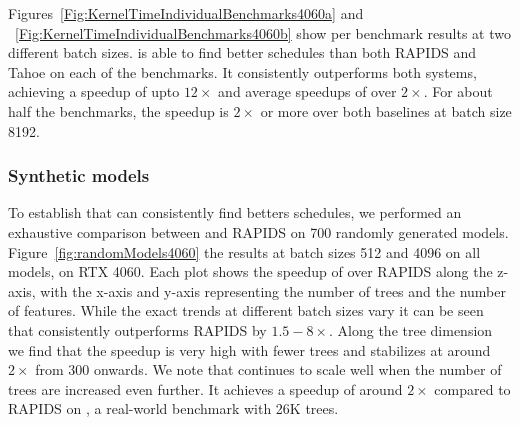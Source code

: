 
Figures~\ref{Fig:KernelTimeIndividualBenchmarks4060a} and ~\ref{Fig:KernelTimeIndividualBenchmarks4060b} 
show per benchmark results at two different batch sizes. 
\Treebeard{} is able to find better schedules than both RAPIDS and Tahoe on each of the benchmarks. It consistently
outperforms both systems, achieving a speedup of upto $12\times$ and average speedups of over $2\times$.
For about half the benchmarks, the speedup is $2\times$ or more over both baselines at batch size 8192.

\subsubsection*{Synthetic models}
To establish that \Treebeard{} can consistently find betters schedules, we performed an exhaustive comparison between \Treebeard{} and RAPIDS on 700 randomly generated models.   
Figure~\ref{fig:randomModels4060} the results at batch sizes 512 and 4096 on all models, on RTX 4060. 
Each plot shows the speedup of \Treebeard{} over RAPIDS along the z-axis, with the x-axis and y-axis representing the number of trees and the number of features. 
While the exact trends at different batch sizes vary it can be seen that \Treebeard{} consistently outperforms RAPIDS by $1.5-8\times$. Along the tree 
dimension we find that the speedup is very high with fewer trees and stabilizes at around $2\times$ from 300 onwards. We note that \Treebeard{} continues to scale well 
when the number of trees are increased even further. It achieves a speedup of around $2\times$ compared to RAPIDS on , a real-world benchmark
with 26K trees.

